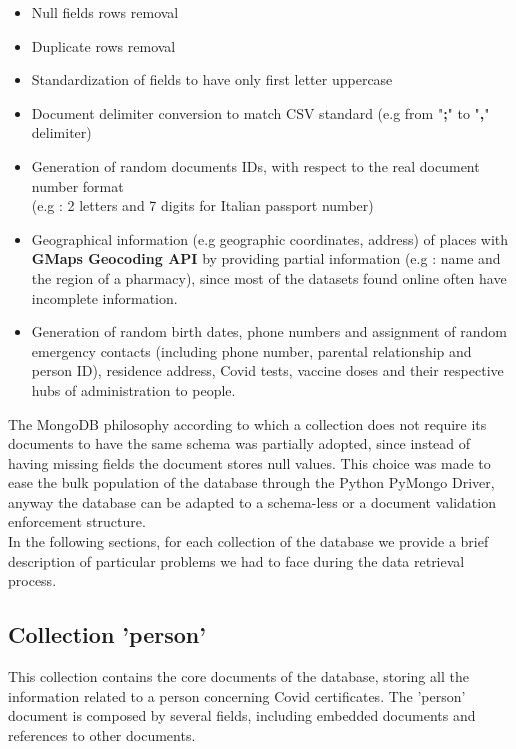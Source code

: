 \documentclass{article}[IEEEtran]
\begin{document}
\begin{itemize}
    \item Null fields rows removal
    \item Duplicate rows removal
    \item Standardization of fields to have only first letter uppercase
    \item Document delimiter conversion to match CSV standard (e.g from "\textbf{;}" to "\textbf{,}" delimiter)
    \item Generation of random documents IDs, with respect to the real document number format \\ (e.g : 2 letters and 7 digits for Italian passport number)
    \item  Geographical information (e.g geographic coordinates, address) of places with \textbf{GMaps Geocoding API}\cite{GMapsAPI} by providing partial information (e.g : name and the region of a pharmacy), since most of the datasets found online often have incomplete information.
    \item Generation of random birth dates, phone numbers and assignment of random emergency contacts (including phone number, parental relationship and person ID), residence address, Covid tests, vaccine doses and their respective hubs of administration to people.
\end{itemize}

The MongoDB philosophy according to which a collection does not require its documents to have the same schema was partially adopted, since instead of having missing fields the document stores null values. This choice was made to ease the bulk population of the database through the Python PyMongo Driver, anyway the database can be adapted to a schema-less or a document validation enforcement structure.
\\ 
In the following sections, for each collection of the database we provide a brief description of particular problems we had to face during the data retrieval process. 

\subsection{Collection 'person'}

This collection contains the core documents of the database, storing all the information related to a person concerning Covid certificates.
The 'person' document is composed by several fields, including embedded documents and references to other documents.
\end{document}
